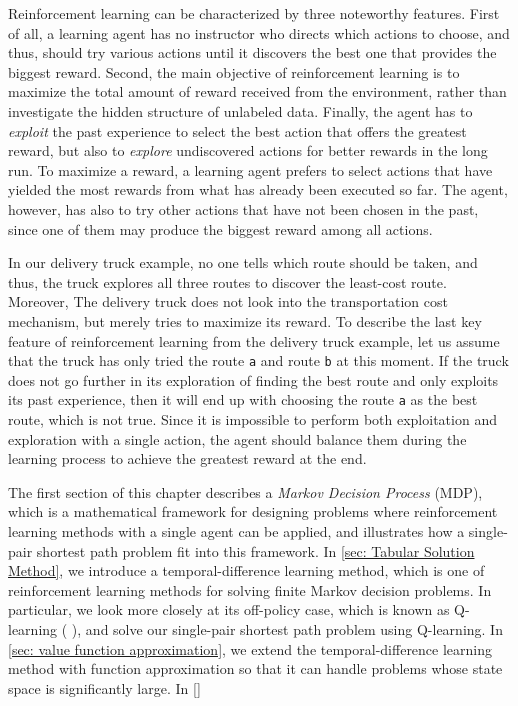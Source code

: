 Reinforcement learning can be characterized by three noteworthy features. First of all, a learning agent has no instructor who directs which actions to choose, and thus, should try various actions until it discovers the best one that provides the biggest reward. Second, the main objective of reinforcement learning is to maximize the total amount of reward received from the environment, rather than investigate the hidden structure of unlabeled data. Finally, the agent has to \textit{exploit} the past experience to select the best action that offers the greatest reward, but also to \textit{explore} undiscovered actions for better rewards in the long run. To maximize a reward, a learning agent prefers to select actions that have yielded the most rewards from what has already been executed so far. The agent, however, has also to try other actions that have not been chosen in the past, since one of them may produce the biggest reward among all actions.

In our delivery truck example, no one tells which route should be taken, and thus, the truck explores all three routes to discover the least-cost route. Moreover, The delivery truck does not look into the transportation cost mechanism, but merely tries to maximize its reward. To describe the last key feature of reinforcement learning from the delivery truck example, let us assume that the truck has only tried the route \texttt{a} and route \texttt{b} at this moment. If the truck does not go further in its exploration of finding the best route and only exploits its past experience, then it will end up with choosing the route \texttt{a} as the best route, which is not true. Since it is impossible to perform both exploitation and exploration with a single action, the agent should balance them during the learning process to achieve the greatest reward at the end.

The first section of this chapter describes a \textit{Markov Decision Process} (MDP), which is a mathematical framework for designing problems where reinforcement learning methods with a single agent can be applied, and illustrates how a single-pair shortest path problem fit into this framework. In \autoref{sec: Tabular Solution Method}, we introduce a temporal-difference learning method, which is one of reinforcement learning methods for solving finite Markov decision problems. In particular, we look more closely at its off-policy case, which is known as Q-learning (\citeauthor{watkins1989learning} \cite{watkins1989learning}), and solve our single-pair shortest path problem using Q-learning. In \autoref{sec: value function approximation}, we extend the temporal-difference learning method with function approximation so that it can handle problems whose state space is significantly large. In \autoref{}



